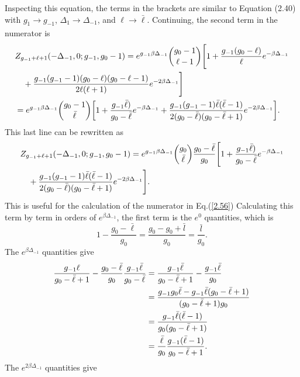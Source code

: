 Inspecting this equation, the terms in the brackets are similar to Equation (2.40) with $g_1\xrightarrow[]{}g_{-1}$, $\Delta_1\xrightarrow[]{}\Delta_{-1}$, and $\ell \xrightarrow[]{}\bar{\ell}$. Continuing, the second term in the numerator is
\begin{align}
    &Z_{g_{-1}+\ell+1}(-\Delta_{-1},0;g_{-1},g_0-1)=e^{g_{-1}\beta\Delta_{-1}}{g_0-1\choose \ell-1}\Biggr[1+\frac{g_{-1}(g_0-\ell)}{\ell}e^{-\beta\Delta_{-1}}\nonumber\\
    &\quad+\frac{g_{-1}(g_{-1}-1)(g_0-\ell)(g_0-\ell-1)}{2\ell(\ell+1)}e^{-2\beta\Delta_{-1}}\Biggr]\nonumber\\
    &=e^{g_{-1}\beta\Delta_{-1}}{g_0-1\choose \Bar{\ell}} \qty[1+\frac{g_{-1}\Bar{\ell})}{g_0-\Bar{\ell}}e^{-\beta\Delta_{-1}}+\frac{g_{-1}(g_{-1}-1)\Bar{\ell}(\Bar{\ell}-1)}{2(g_0-\Bar{\ell})(g_0-\Bar{\ell}+1)}e^{-2\beta\Delta_{-1}}].
\end{align}
This last line can be rewritten as 
\begin{align}
    &Z_{g_{-1}+\ell+1}(-\Delta_{-1},0;g_{-1},g_0-1)=e^{g_{-1}\beta\Delta_{-1}}{g_0\choose \Bar{\ell}} \frac{g_0-\bar{\ell}}{g_0} \Biggr[1+\frac{g_{-1}\Bar{\ell})}{g_0-\Bar{\ell}}e^{-\beta\Delta_{-1}}\nonumber\\
    &\quad+\frac{g_{-1}(g_{-1}-1)\Bar{\ell}(\Bar{\ell}-1)}{2(g_0-\Bar{\ell})(g_0-\Bar{\ell}+1)}e^{-2\beta\Delta_{-1}}\Biggr].
\end{align}
This is useful for the calculation of the numerator in Eq.\@ (\ref{2.56}) Calculating this term by term in orders of $e^{\beta\Delta_{-1}}$, the first term is the $e^0$ quantities, which is 
\begin{equation}
    1-\frac{g_0-\bar{\ell}}{g_0}=\frac{g_0-g_0+\bar{l}}{g_0}=\frac{\bar{l}}{g_0}.
\end{equation}
The $e^{\beta\Delta_{-1}}$ quantities give
\begin{align}
    \frac{g_{-1}\ell}{g_0-\Bar{\ell}+1}-\frac{g_0-\Bar{\ell}}{g_0}\frac{g_{-1}\bar{\ell}}{g_0-\bar{\ell}}&=\frac{g_{-1}\bar{\ell}}{g_0-\bar{\ell}+1}-\frac{g_{-1}\bar{\ell}}{g_0}\nonumber\\
    &=\frac{g_{-1}g_0\bar{\ell}-g_{-1}\bar{\ell}(g_0-\bar{\ell}+1)}{(g_0-\bar{\ell}+1)g_0}\nonumber\\
    &=\frac{g_{-1}\bar{\ell}(\bar{\ell}-1)}{g_0(g_0-\bar{\ell}+1)}\nonumber\\
    &=\frac{\bar{\ell}}{g_0} \frac{g_{-1}(\bar{\ell}-1)}{g_0-\bar{\ell}+1}.
\end{align}
The $e^{2\beta\Delta_{-1}}$ quantities give
